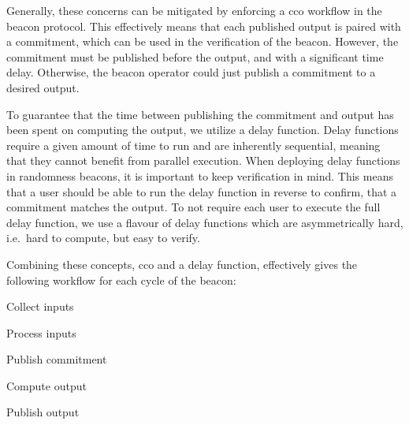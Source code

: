 Generally, these concerns can be mitigated by enforcing a \gls{cco} workflow in the beacon protocol.
This effectively means that each published output is paired with a commitment, which can be used in the verification of the beacon.
However, the commitment must be published before the output, and with a significant time delay.
Otherwise, the beacon operator could just publish a commitment to a desired output.

To guarantee that the time between publishing the commitment and output has been spent on computing the output, we utilize a delay function.
Delay functions require a given amount of time to run and are inherently sequential, meaning that they cannot benefit from parallel execution.
When deploying delay functions in randomness beacons, it is important to keep verification in mind.
This means that a user should be able to run the delay function in reverse to confirm, that a commitment matches the output.
To not require each user to execute the full delay function, we use a flavour of delay functions which are asymmetrically hard, i.e.\ hard to compute, but easy to verify.

Combining these concepts, \gls{cco} and a delay function, effectively gives the following workflow for each cycle of the beacon:

\begin{enumberate}
    \item Collect inputs
    \item Process inputs
    \item Publish commitment
    \item Compute output
    \item Publish output
\end{enumberate}

